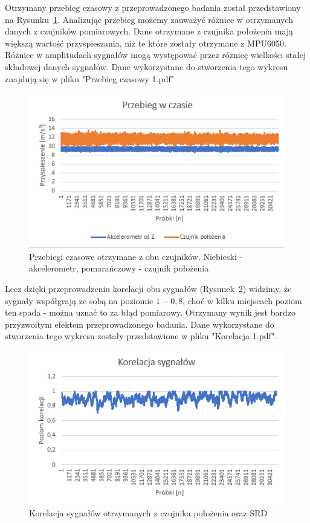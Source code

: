 \documentclass[a4paper, 12pt]{mwart}
\begin{document}
Otrzymany przebieg czasowy z przeprowadzonego badania został przedstawiony na Rysunku~\ref{fig:timeplot1}. Analizując przebieg możemy zauważyć różnice w otrzymanych danych z czujników pomiarowych. Dane otrzymane z czujnika położenia mają większą wartość przyspieszania, niż te które zostały otrzymane z MPU6050. Różnice w amplitudach sygnałów mogą występować przez różnicę wielkości stałej składowej danych sygnałów. Dane wykorzystane do stworzenia tego wykresu znajdują się w pliku "Przebieg czasowy 1.pdf"

\begin{figure}[h!]
	\centering
	\includegraphics[width=0.95\linewidth]{assets/timePlot1}
	\caption{Przebiegi czasowe otrzymane z obu czujników. Niebieski - akcelerometr, pomarańczowy - czujnik położenia}
	\label{fig:timeplot1}
\end{figure}

Lecz dzięki przeprowadzeniu korelacji obu sygnałów (Rysunek~\ref{fig:korelacja1}) widzimy, że sygnały współgrają ze sobą na poziomie $1 - 0,8$, choć w kilku miejscach poziom ten spada - można uznać to za błąd pomiarowy. Otrzymany wynik jest bardzo przyzwoitym efektem przeprowadzonego badania. Dane wykorzystane do stworzenia tego wykresu zostały przedstawione w pliku "Korelacja 1.pdf".

\begin{figure}[h!]
	\centering
	\includegraphics[width=0.9\linewidth]{assets/korelacja1}
	\caption{Korelacja sygnałów otrzymanych z czujnika położenia oraz SRD}
	\label{fig:korelacja1}
\end{figure}
\end{document}
